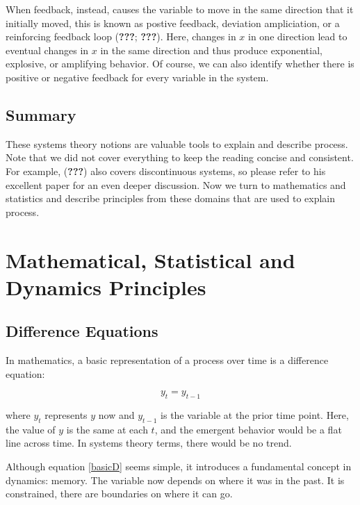\documentclass[english,,man]{apa6}
\theoremstyle{definition}
\theoremstyle{definition}
\theoremstyle{definition}
\theoremstyle{remark}
\begin{document}
When feedback, instead, causes the variable to move in the same
direction that it initially moved, this is known as postive feedback,
deviation ampliciation, or a reinforcing feedback loop ({\textbf{???}};
{\textbf{???}}). Here, changes in \(x\) in one direction lead to
eventual changes in \(x\) in the same direction and thus produce
exponential, explosive, or amplifying behavior. Of course, we can also
identify whether there is positive or negative feedback for every
variable in the system.

\hypertarget{summary}{%
\subsection{Summary}\label{summary}}

These systems theory notions are valuable tools to explain and describe
process. Note that we did not cover everything to keep the reading
concise and consistent. For example, ({\textbf{???}}) also covers
discontinuous systems, so please refer to his excellent paper for an
even deeper discussion. Now we turn to mathematics and statistics and
describe principles from these domains that are used to explain process.

\hypertarget{mathematical-statistical-and-dynamics-principles}{%
\section{Mathematical, Statistical and Dynamics
Principles}\label{mathematical-statistical-and-dynamics-principles}}

\hypertarget{difference-equations}{%
\subsection{Difference Equations}\label{difference-equations}}

In mathematics, a basic representation of a process over time is a
difference equation:

\begin{equation}
\label{basicD}
y_{t} = y_{t - 1}
\end{equation}

\noindent where \(y_{t}\) represents \(y\) now and \(y_{t-1}\) is the
variable at the prior time point. Here, the value of \(y\) is the same
at each \(t\), and the emergent behavior would be a flat line across
time. In systems theory terms, there would be no trend.

Although equation \ref{basicD} seems simple, it introduces a fundamental
concept in dynamics: memory. The variable now depends on where it was in
the past. It is constrained, there are boundaries on where it can go.
\end{document}
